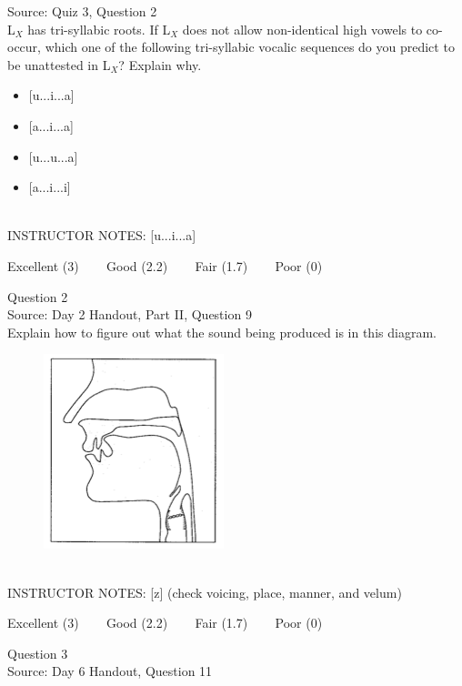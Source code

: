 \documentclass[12pt]{article}
\begin{document}
Source: Quiz 3, Question 2\\

L$_X$ has tri-syllabic roots. If L$_X$ does not allow non-identical high vowels to co-occur, which one of the following tri-syllabic vocalic sequences do you predict to be unattested in L$_X$? Explain why.\\

\begin{itemize} \item {[u...i...a]} \item {[a...i...a]} \item {[u...u...a]} \item {[a...i...i]} \end{itemize}


~\\
INSTRUCTOR NOTES: [u...i...a]


\vfill
Excellent (3) ~~~ Good (2.2) ~~~ Fair (1.7) ~~~ Poor (0)
\newpage

{\large Question 2}\\

Source: Day 2 Handout, Part II, Question 9\\

Explain how to figure out what the sound being produced is in this diagram.\\

\begin{figure}[H]
\includegraphics{../images/sagittal_z.png}
\end{figure}

~\\
INSTRUCTOR NOTES: [z] (check voicing, place, manner, and velum)


\vfill
Excellent (3) ~~~ Good (2.2) ~~~ Fair (1.7) ~~~ Poor (0)
\newpage

{\large Question 3}\\

Source: Day 6 Handout, Question 11\\
\end{document}
